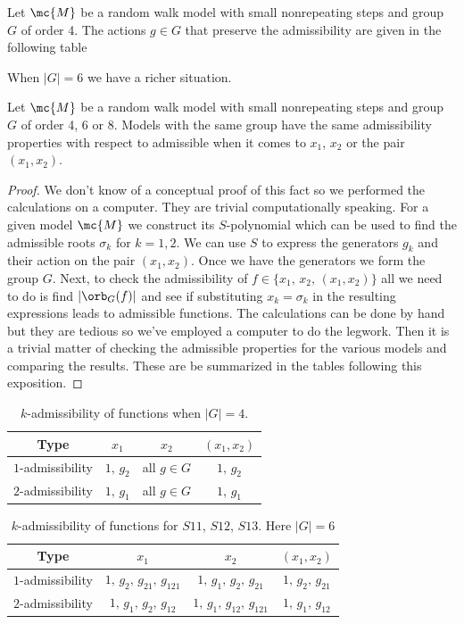 \begin{prop} Let $\mc{M}$ be a random walk model with small nonrepeating steps and group $G$ of order 4. The actions $g \in G$ that preserve the admissibility are given in the following table
\end{prop}

When $|G| = 6$ we have a richer situation.

\begin{prop} Let $\mc{M}$ be a random walk model with small nonrepeating steps and group $G$ of order 4, 6 or 8. Models with the same group have the same admissibility properties with respect to admissible when it comes to $x_1$, $x_2$ or the pair $(x_1,x_2)$.
\end{prop}
\begin{proof} We don't know of a conceptual proof of this fact so we performed the calculations on a computer. They are trivial computationally speaking. For a given model $\mc{M}$ we construct its $S$-polynomial which can be used to find the admissible roots $\sigma_k$ for $k =1,2$. We can use $S$ to express the generators $g_k$ and their action on the pair $(x_1,x_2)$. Once we have the generators we form the group $G$. Next, to check the admissibility of $f\in \{x_1,\,x_2,\,(x_1,x_2)\}$ all we need to do is find $|\orb_G(f)|$ and see if substituting $x_k = \sigma_k$ in the resulting expressions leads to admissible functions. The calculations can be done by hand but they are tedious so we've employed a computer to do the legwork. Then it is a trivial matter of checking the admissible properties for the various models and comparing the results. These are be summarized in the tables following this exposition.
\end{proof}

\begin{table}[H]
\caption{$k$-admissibility of functions when $|G| = 4$.}
\label{tbl:Admissibility4}
\centering
\begin{tabular}{cccc}
\toprule
	Type & $x_1$  & $x_2$ & $(x_1,x_2)$ \\
\midrule
	$1$-admissibility & $1,\, g_2$  & all $g\in G$ & $1,\, g_2$\\
	$2$-admissibility & $1,\, g_1$  & all $g\in G$ & $1,\, g_1$\\
\bottomrule
\end{tabular}
\end{table}

\begin{table}[H]
\caption{$k$-admissibility of functions for $S11$, $S12$, $S13$. Here $|G| = 6$}
\label{tbl:Admissibility61}
\centering
\begin{tabular}{cccc}
\toprule
	Type & $x_1$  & $x_2$ & $(x_1,x_2)$ \\
\midrule
	$1$-admissibility & $1,\, g_{2} ,\, g_{21} ,\, g_{121}$ & $1,\, g_{1} ,\, g_{2} ,\, g_{21}$ & $1,\, g_{2} ,\, g_{21} $ \\
	$2$-admissibility & $1,\, g_{1} ,\, g_{2} ,\, g_{12}$ & $1,\, g_{1} ,\, g_{12} ,\, g_{121}$ & $1,\, g_{1} ,\, g_{12}$ \\
\bottomrule
\end{tabular}
\end{table}

